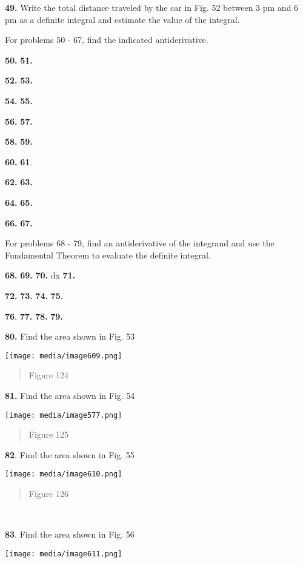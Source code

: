 \textbf{49.} Write the total distance traveled by the car in Fig. 52
between 3 pm and 6 pm as a definite integral and estimate the value of
the integral.

For problems 50 - 67, find the indicated antiderivative.

\textbf{50.} \textbf{51.}

\textbf{52.} \textbf{53.}

\textbf{54.} \textbf{55.}

\textbf{56.} \textbf{57.}

\textbf{58.} \textbf{59.}

\textbf{60.} \textbf{61}.

\textbf{62.} \textbf{63.}

\textbf{64.} \textbf{65.}

\textbf{66.} \textbf{67.}

For problems 68 - 79, find an antiderivative of the integrand and use
the Fundamental Theorem to evaluate the definite integral.

\textbf{68.} \textbf{69.} \textbf{70.} dx \textbf{71.}

\textbf{72.} \textbf{73.} \textbf{74.} \textbf{75.}

\textbf{76}. \textbf{77.} \textbf{78.} \textbf{79.}

\textbf{80.} Find the area shown in Fig. 53

\texttt{[image: media/image609.png]}

\begin{quote}
Figure 124
\end{quote}

\textbf{81.} Find the area shown in Fig. 54

\texttt{[image: media/image577.png]}

\begin{quote}
Figure 125
\end{quote}

\textbf{82}. Find the area shown in Fig. 55

\texttt{[image: media/image610.png]}

\begin{quote}
Figure 126
\end{quote}

\textbf{\\
}

\textbf{83}. Find the area shown in Fig. 56

\texttt{[image: media/image611.png]}

